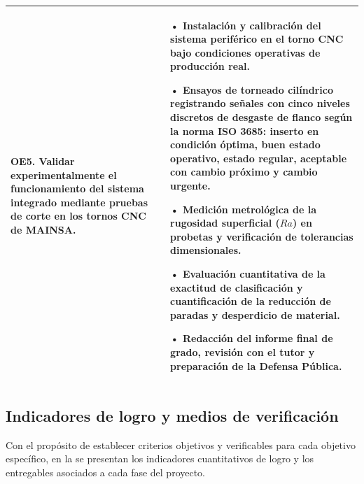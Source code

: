 {\begin{longtable}{|>{\raggedright\arraybackslash}p{4.8cm}|>{\raggedright\arraybackslash}p{9.2cm}|}
\textbf{OE5.} Validar experimentalmente el funcionamiento del sistema integrado mediante pruebas de corte en los tornos CNC de MAINSA. & 
• Instalación y calibración del sistema periférico en el torno CNC bajo condiciones operativas de producción real.\par\vspace{1mm}
• Ensayos de torneado cilíndrico registrando señales con cinco niveles discretos de desgaste de flanco según la norma ISO 3685: inserto en condición óptima, buen estado operativo, estado regular, aceptable con cambio próximo y cambio urgente.\par\vspace{1mm}
• Medición metrológica de la rugosidad superficial ($Ra$) en probetas y verificación de tolerancias dimensionales.\par\vspace{1mm}
• Evaluación cuantitativa de la exactitud de clasificación y cuantificación de la reducción de paradas y desperdicio de material.\par\vspace{1mm}
• Redacción del informe final de grado, revisión con el tutor y preparación de la Defensa Pública.\\ \hline

\end{longtable}
}

\subsection{Indicadores de logro y medios de verificación}
Con el propósito de establecer criterios objetivos y verificables para cada objetivo específico, en la  se presentan los indicadores cuantitativos de logro y los entregables asociados a cada fase del proyecto.

